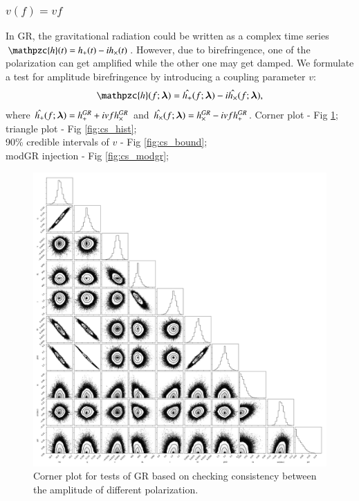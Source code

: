 \documentclass[prd,preprintnumbers,twocolumn,eqsecnum,floatfix,a4paper,nofootinbib,superscriptaddress]{revtex4}
\newcommand{\h}{\mathpzc{h}}
\newcommand{\blambda}{\bm{\lambda}}
\begin{document}
\subsubsection{$v(f) = v f$}
In GR, the gravitational radiation could be written as a complex time series $\h(t)=h_+(t) - ih_\times(t)$. However, due to birefringence, one of the polarization can get amplified while the other one may get damped. We formulate a test for amplitude birefringence by introducing a coupling parameter $v$:
\begin{eqnarray} 
\h(f; \blambda) =  \Hat{h_+}(f; \blambda) - i \Hat{h_\times}(f; \blambda),
\label{eq:test_cs}
\end{eqnarray}
where $\Hat{h_+}(f; \blambda)=h^{GR}_+ + i v f h^{GR}_{\times}$ and $\Hat{h_\times}(f; \blambda)=h^{GR}_\times - i v f h^{GR}_{+}$.
Corner plot  - Fig \ref{fig:cs_corner};\\
triangle plot - Fig \ref{fig:cs_hist};\\
90\% credible intervals of $v$  - Fig \ref{fig:cs_bound};\\
modGR injection - Fig \ref{fig:cs_modgr};

\newpage

\begin{figure}[h!]
    \begin{center}
    \includegraphics[scale=0.3]{figs/v1_80925_corner_plot.png} 
    \end{center} 
    \caption{Corner plot for tests of GR based on checking consistency between the amplitude of different polarization.}
    \label{fig:cs_corner}
\end{figure}
\end{document}
